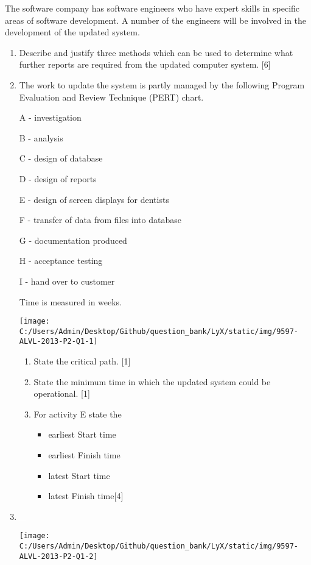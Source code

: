 The software company has software engineers who have expert skills
in specific areas of software development. A number of the engineers
will be involved in the development of the updated system.
\begin{enumerate}
\item Describe and justify three methods which can be used to determine
what further reports are required from the updated computer system.
{[}6{]}
\item The work to update the system is partly managed by the following Program
Evaluation and Review Technique (PERT) chart.

A - investigation 

B - analysis 

C - design of database 

D - design of reports 

E - design of screen displays for dentists 

F - transfer of data from files into database 

G - documentation produced 

H - acceptance testing 

I - hand over to customer

Time is measured in weeks.
\begin{center}
\texttt{[image: C:/Users/Admin/Desktop/Github/question\_bank/LyX/static/img/9597-ALVL-2013-P2-Q1-1]}
\par\end{center}
\begin{enumerate}
\item State the critical path.\hfill{} {[}1{]}
\item State the minimum time in which the updated system could be operational.
\hfill{}{[}1{]}
\item For activity E state the 
\begin{itemize}
\item earliest Start time 
\item earliest Finish time 
\item latest Start time
\item latest Finish time\hfill{}{[}4{]}
\end{itemize}
\end{enumerate}
\item {}\textcolor{white}{\_}
\begin{center}
\texttt{[image: C:/Users/Admin/Desktop/Github/question\_bank/LyX/static/img/9597-ALVL-2013-P2-Q1-2]}
\par\end{center}


\end{enumerate}
